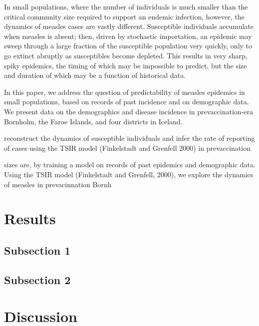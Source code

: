 \documentclass[10pt]{article}
\begin{document}
In small populations, where the number of individuals is much smaller than the critical community size required to support an endemic infection, however, the dynamics of measles cases are vastly different. Susceptible individuals accumulate when measles is absent; then, driven by stochastic importation, an epidemic may sweep through a large fraction of the susceptible population very quickly, only to go extinct abruptly as susceptibles become depleted. This results in very sharp, spiky epidemics, the timing of which may be impossible to predict, but the size and duration of which may be a function of historical data. 

In this paper, we address the question of predictability of measles epidemics in small populations, based on records of past incidence and on demographic data. We present data on the demographics and disease incidence in prevaccination-era Bornholm, the Faroe Islands, and four districts in Iceland. 

reconstruct the dynamics of susceptible individuals and infer the rate of reporting of cases using the TSIR model (Finkelstadt and Grenfell 2000) in prevaccination 
 


sizes are, by training a model on records of past epidemics and demographic data. Using the TSIR model (Finkelstadt and Grenfell, 2000), we explore the dynamics of measles in prevacinnation Bornh










\section*{Results}

\subsection*{Subsection 1}

\subsection*{Subsection 2}












\section*{Discussion}
\end{document}
